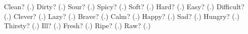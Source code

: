 \begin{tcolorbox}[breakable,colback=teal!4,colframe=teal!35!black,title={Before you move on}]
Clean? (\textbf{}.) Dirty? (\textbf{}.) Sour? (\textbf{}.) Spicy? (\textbf{}.) Soft? (\textbf{}.) Hard? (\textbf{}.) Easy? (\textbf{}.) Difficult? (\textbf{}.) Clever? (\textbf{}.) Lazy? (\textbf{}.) Brave? (\textbf{}.) Calm? (\textbf{}.) Happy? (\textbf{}.) Sad? (\textbf{}.) Hungry? (\textbf{}.) Thirsty? (\textbf{}.) Ill? (\textbf{}.) Fresh? (\textbf{}.) Ripe? (\textbf{}.) Raw? (\textbf{}.)
\end{tcolorbox}
